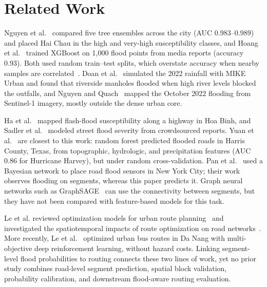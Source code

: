 \section{Related Work}
\label{sec:related}

Nguyen et al.~\cite{nguyen2026} compared five tree ensembles across the city (AUC 0.983--0.989) and placed Hai Chau in the high and very-high susceptibility classes, and Hoang et al.~\cite{hoang2025} trained XGBoost on 1,000 flood points from media reports (accuracy 0.93). Both used random train--test splits, which overstate accuracy when nearby samples are correlated~\cite{roberts2017}. Doan et al.~\cite{doan2023} simulated the 2022 rainfall with MIKE Urban and found that riverside manholes flooded when high river levels blocked the outfalls, and Nguyen and Quach~\cite{nguyenquach2024} mapped the October 2022 flooding from Sentinel-1 imagery, mostly outside the dense urban core.

Ha et al.~\cite{ha2021} mapped flash-flood susceptibility along a highway in Hoa Binh, and Sadler et al.~\cite{sadler2018} modeled street flood severity from crowdsourced reports. Yuan et al.~\cite{yuan2023} are closest to this work: random forest predicted flooded roads in Harris County, Texas, from topographic, hydrologic, and precipitation features (AUC 0.86 for Hurricane Harvey), but under random cross-validation. Pan et al.~\cite{pan2026} used a Bayesian network to place road flood sensors in New York City; their work observes flooding on segments, whereas this paper predicts it. Graph neural networks such as GraphSAGE~\cite{hamilton2017} can use the connectivity between segments, but they have not been compared with feature-based models for this task.

Le et al. reviewed optimization models for urban route planning~\cite{atr2026} and investigated the spatiotemporal impacts of route optimization on road networks~\cite{treng2026}. More recently, Le et al.~\cite{le2026} optimized urban bus routes in Da Nang with multi-objective deep reinforcement learning, without hazard costs. Linking segment-level flood probabilities to routing connects these two lines of work, yet no prior study combines road-level segment prediction, spatial block validation, probability calibration, and downstream flood-aware routing evaluation.
